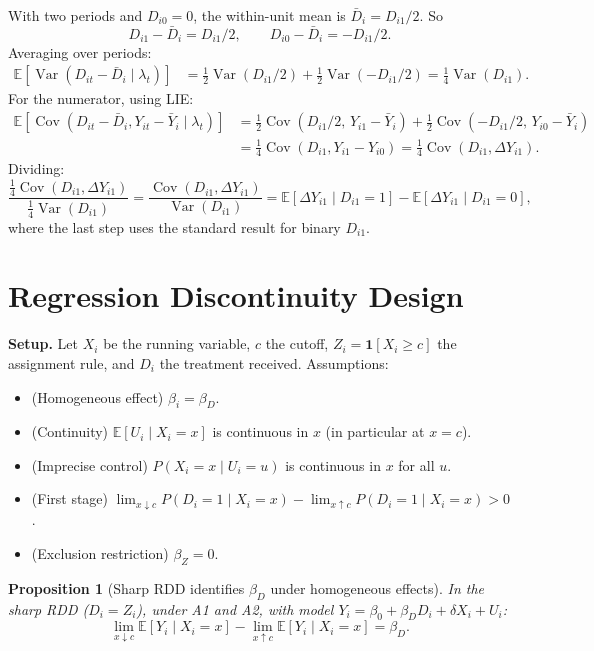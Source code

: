 \documentclass[12pt,a4paper]{article}
\theoremstyle{plain}
\newtheorem{propositio}{Proposition}[section]
\theoremstyle{definition}
\renewenvironment{proof}{\pushQED{\qed}\normalfont}{\popQED\par\nobreak}
\newcommand{\E}{\mathbb{E}}
\newcommand{\Cov}{\operatorname{Cov}}
\newcommand{\Var}{\operatorname{Var}}
\begin{document}
\begin{proof}
With two periods and $D_{i0}=0$, the within-unit mean is $\bar D_i = D_{i1}/2$. So
\[
  D_{i1}-\bar D_i = D_{i1}/2, \qquad D_{i0}-\bar D_i = -D_{i1}/2.
\]
Averaging over periods:
\begin{align*}
  \E[\Var(D_{it}-\bar D_i\mid\lambda_t)]
  &= \frac{1}{2}\Var(D_{i1}/2)+\frac{1}{2}\Var(-D_{i1}/2)
   = \frac{1}{4}\Var(D_{i1}).
\end{align*}
For the numerator, using LIE:
\begin{align*}
  \E[\Cov(D_{it}-\bar D_i,Y_{it}-\bar Y_i\mid\lambda_t)]
  &= \frac{1}{2}\Cov(D_{i1}/2,\,Y_{i1}-\bar Y_i)
   + \frac{1}{2}\Cov(-D_{i1}/2,\,Y_{i0}-\bar Y_i)\\
  &= \frac{1}{4}\Cov(D_{i1},Y_{i1}-Y_{i0})
   = \frac{1}{4}\Cov(D_{i1},\Delta Y_{i1}).
\end{align*}
Dividing:
\[
  \frac{\frac{1}{4}\Cov(D_{i1},\Delta Y_{i1})}{\frac{1}{4}\Var(D_{i1})}
  = \frac{\Cov(D_{i1},\Delta Y_{i1})}{\Var(D_{i1})}
  = \E[\Delta Y_{i1}\mid D_{i1}=1]-\E[\Delta Y_{i1}\mid D_{i1}=0],
\]
where the last step uses the standard result for binary $D_{i1}$.
\end{proof}

\section{Regression Discontinuity Design}

\noindent\textbf{Setup.}
Let $X_i$ be the running variable, $c$ the cutoff, $Z_i=\mathbf{1}[X_i\ge c]$ the assignment rule, and $D_i$ the treatment received.
Assumptions:
\begin{itemize}[leftmargin=2em]
  \item[A1] (Homogeneous effect) $\beta_i=\beta_D$.
  \item[A2] (Continuity) $\E[U_i\mid X_i=x]$ is continuous in $x$ (in particular at $x=c$).
  \item[A2'] (Imprecise control) $P(X_i=x\mid U_i=u)$ is continuous in $x$ for all $u$.
  \item[A3] (First stage) $\lim_{x\downarrow c}P(D_i=1\mid X_i=x)-\lim_{x\uparrow c}P(D_i=1\mid X_i=x)>0$.
  \item[A4] (Exclusion restriction) $\beta_Z=0$.
\end{itemize}

\begin{propositio}[Sharp RDD identifies $\beta_D$ under homogeneous effects\label{prop:srdd_homog}]
In the sharp RDD ($D_i=Z_i$), under A1 and A2, with model $Y_i=\beta_0+\beta_D D_i+\delta X_i+U_i$:
\[
  \lim_{x\downarrow c}\E[Y_i\mid X_i=x] - \lim_{x\uparrow c}\E[Y_i\mid X_i=x] = \beta_D.
\]
\end{propositio}
\end{document}
